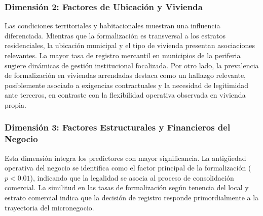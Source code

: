 \documentclass[11pt,a4paper]{article}
\begin{document}
\subsubsection{Dimensión 2: Factores de Ubicación y Vivienda}



\par
Las condiciones territoriales y habitacionales muestran una influencia diferenciada. Mientras que la formalización es transversal a los estratos residenciales, la ubicación municipal y el tipo de vivienda presentan asociaciones relevantes. La mayor tasa de registro mercantil en municipios de la periferia sugiere dinámicas de gestión institucional focalizada. Por otro lado, la prevalencia de formalización en viviendas arrendadas destaca como un hallazgo relevante, posiblemente asociado a exigencias contractuales y la necesidad de legitimidad ante terceros, en contraste con la flexibilidad operativa observada en vivienda propia.

\subsubsection{Dimensión 3: Factores Estructurales y Financieros del Negocio}




\par
Esta dimensión integra los predictores con mayor significancia. La antigüedad operativa del negocio se identifica como el factor principal de la formalización ($p < 0.01$), indicando que la legalidad se asocia al proceso de consolidación comercial. La similitud en las tasas de formalización según tenencia del local y estrato comercial indica que la decisión de registro responde primordialmente a la trayectoria del micronegocio.
\end{document}
